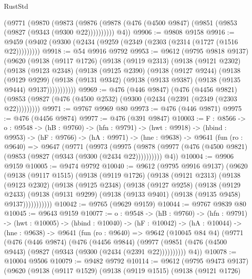 \begin{lexlean}{RustStd}
\begin{coremodule}
      (@9771
        (@9870
          (@9873 (@9876 (@9878 (@476 (@4500 @9847) (@9851 (@9853 (@9827 (@9343 (@9300 @22))))))))))
        @4))
@9906 := @9808 @9158
@9916 := @9459 (@9402 (@9300 (@2434 (@9259 (@2349 (@2303 (@2314 (@1727 (@1516 @22)))))))))
@9918 := @54 @9916 @9792
@9953 := @9612
    (@9795 @9818 @9137)
    (@9620
      (@9138
        (@9117 @1726)
        (@9138
          (@9119 @2313)
          (@9138
            (@9121 @2302)
            (@9138
              (@9123 @2348)
              (@9138
                (@9125 @2390)
                (@9138
                  (@9127 @9244)
                  (@9138
                    (@9129 @9299)
                    (@9138 (@9131 @9342) (@9138 (@9133 @9387) (@9138 (@9135 @9444) @9137)))))))))))
@9969 := @476
    (@446 @9847)
    (@476
      (@4456 @9821)
      (@9853 (@9827 (@476 (@4500 @2532) (@9300 (@2434 (@2391 (@2349 (@2303 @22)))))))))
@9971 := @9767 @9969 @80
@9973 := @476 (@446 @9871)
@9975 := @476 (@4456 @9874)
@9977 := @476 (@391 @9847)
@10003 := {F : @8566} ->
  {o : @9548} ->
  (hB : @9760) ->
  (hfn : @9791) ->
  (hwt : @9918) ->
  (hbind : @9953) ->
  (hF : @9766) ->
  (hA : @9971) ->
  (hne : @9638) ->
  @9641
    (fun (ro : @9640) =>
    @9647
      (@9771
        (@9973
          (@9975 (@9878 (@9977 (@476 (@4500 @9821) (@9853 (@9827 (@9343 (@9300 (@2434 @22))))))))))
        @4))
@10004 := @9906 @9159
@10005 := @9474 @9792
@10040 := @9612
    (@9795 @9916 @9137)
    (@9620
      (@9138
        (@9117 @1515)
        (@9138
          (@9119 @1726)
          (@9138
            (@9121 @2313)
            (@9138
              (@9123 @2302)
              (@9138
                (@9125 @2348)
                (@9138
                  (@9127 @9258)
                  (@9138
                    (@9129 @2433)
                    (@9138 (@9131 @9299) (@9138 (@9133 @9401) (@9138 (@9135 @9458) @9137)))))))))))
@10042 := @9765 (@9629 @9159)
@10044 := @9767 @9839 @80
@10045 := @9643 @9159
@10077 := {o : @9548} ->
  (hB : @9760) ->
  (hfn : @9791) ->
  (hwt : @10005) ->
  (hbind : @10040) ->
  (hF : @10042) ->
  (hA : @10044) ->
  (hne : @9638) ->
  @9641
    (fun (ro : @9640) =>
    @9642
      (@10045 @84 @4)
      (@9771
        (@476
          (@446 @9874)
          (@476
            (@4456 @9844)
            (@9977 (@9851 (@476 (@4500 @9443) (@9827 (@9343 (@9300 (@2434 (@2391 @22))))))))))
        @4))
@10078 := @10004 @9506
@10079 := @9482 @9792
@10114 := @9612
    (@9795 @9473 @9137)
    (@9620
      (@9138
        (@9117 @1529)
        (@9138
          (@9119 @1515)
          (@9138
            (@9121 @1726)

\end{coremodule}
\end{lexlean}
